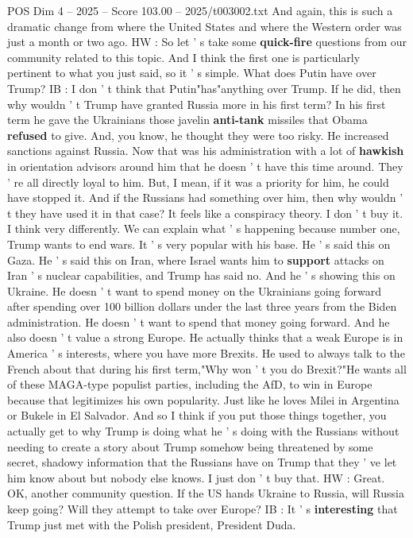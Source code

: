 \begin{textsample}{POS Dim 4 – 2025 – Score 103.00 – 2025/t003002.txt}
And again, this is such a dramatic change from where the United States and where the Western order was just a month or two ago.
HW : So let ' s take some \textbf{quick-fire} questions from our community related to this topic.
And I think the first one is particularly pertinent to what you just said, so it ' s simple.
What does Putin have over Trump?
IB : I don ' t think that Putin"has"anything over Trump.
If he did, then why wouldn ' t Trump have granted Russia more in his first term?
In his first term he gave the Ukrainians those javelin \textbf{anti-tank} missiles that Obama \textbf{refused} to give.
And, you know, he thought they were too risky.
He increased sanctions against Russia.
Now that was his administration with a lot of \textbf{hawkish} in orientation advisors around him that he doesn ' t have this time around.
They ' re all directly loyal to him.
But, I mean, if it was a priority for him, he could have stopped it.
And if the Russians had something over him, then why wouldn ' t they have used it in that case?
It feels like a conspiracy theory.
I don ' t buy it.
I think very differently.
We can explain what ' s happening because number one, Trump wants to end wars.
It ' s very popular with his base.
He ' s said this on Gaza.
He ' s said this on Iran, where Israel wants him to \textbf{support} attacks on Iran ' s nuclear capabilities, and Trump has said no.
And he ' s showing this on Ukraine.
He doesn ' t want to spend money on the Ukrainians going forward after spending over 100 billion dollars under the last three years from the Biden administration.
He doesn ' t want to spend that money going forward.
And he also doesn ' t value a strong Europe.
He actually thinks that a weak Europe is in America ' s interests, where you have more Brexits.
He used to always talk to the French about that during his first term,"Why won ' t you do Brexit?"He wants all of these MAGA-type populist parties, including the AfD, to win in Europe because that legitimizes his own popularity.
Just like he loves Milei in Argentina or Bukele in El Salvador.
And so I think if you put those things together, you actually get to why Trump is doing what he ' s doing with the Russians without needing to create a story about Trump somehow being threatened by some secret, shadowy information that the Russians have on Trump that they ' ve let him know about but nobody else knows.
I just don ' t buy that.
HW : Great.
OK, another community question.
If the US hands Ukraine to Russia, will Russia keep going?
Will they attempt to take over Europe?
IB : It ' s \textbf{interesting} that Trump just met with the Polish president, President Duda.

\end{textsample}
